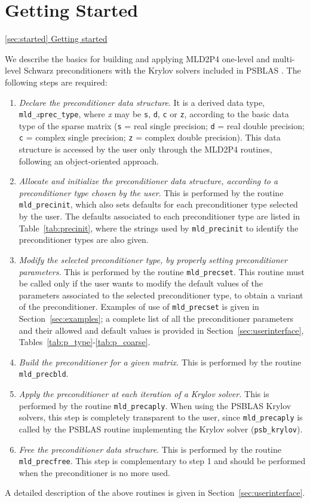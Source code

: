 \section{Getting Started\label{sec:started}}
         {\underline{\ref{sec:started} Getting started}}

We describe the basics for building and applying MLD2P4 one-level and multi-level
Schwarz preconditioners with the Krylov solvers included in PSBLAS \cite{PSBLASGUIDE}.
The following steps are required:
\begin{enumerate} 
\item \emph{Declare the preconditioner data structure}. It is a derived data type,
  \verb|mld_|\-\emph{x}\verb|prec_type|, where \emph{x} may be \verb|s|, \verb|d|, \verb|c|
	or \verb|z|, according to the basic data type of the sparse matrix
	(\verb|s| = real single precision; \verb|d| = real double precision;
	\verb|c| = complex single precision; \verb|z| = complex double precision).
	This data structure is accessed by the user only through the MLD2P4 routines,
	following an object-oriented approach.
\item \emph{Allocate and initialize the preconditioner data structure, according to
	a preconditioner type chosen by the user}. This is performed by the routine
	\verb|mld_precinit|, which also sets defaults for each preconditioner
	type selected by the user. The defaults associated to each preconditioner
	type are listed in Table~\ref{tab:precinit}, where the strings used by
	\verb|mld_precinit| to identify the preconditioner types are also given.
\item \emph{Modify the selected preconditioner type, by properly setting
  preconditioner parameters.} This is performed by the routine \verb|mld_precset|.
  This routine must be called only if the user wants to modify the default values
  of the parameters associated to the selected preconditioner type, to obtain a variant
  of the preconditioner.
  Examples of use of \verb|mld_precset| is given in Section~\ref{sec:examples};
  a complete list of all the
  preconditioner parameters and their allowed and default values is provided in 
  Section~\ref{sec:userinterface}, Tables~\ref{tab:p_type}-\ref{tab:p_coarse}. 
\item \emph{Build the preconditioner for a given matrix.} This is performed by
  the routine \verb|mld_precbld|.
\item \emph{Apply the preconditioner at each iteration of a Krylov solver.}
  This is performed by the routine \verb|mld_precaply|. When using the PSBLAS Krylov solvers,
  this step is completely transparent to the user, since \verb|mld_precaply| is called
  by the PSBLAS routine implementing the Krylov solver (\verb|psb_krylov|).
\item \emph{Free the preconditioner data structure}. This is performed by
  the routine \verb|mld_precfree|. This step is complementary to step 1 and should
  be performed when the preconditioner is no more used.
\end{enumerate}
A detailed description of the above routines is given in Section~\ref{sec:userinterface}.

